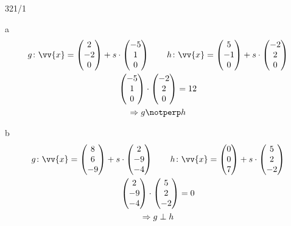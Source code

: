\begin{exercise}{321/1}
  \item [a]
  \begin{gather*}
    g \colon \vv{x} = \begin{pmatrix}2 \\ -2 \\ 0\end{pmatrix} + s \cdot \begin{pmatrix}-5 \\ 1 \\ 0\end{pmatrix} \qquad h \colon \vv{x} = \begin{pmatrix}5 \\ -1 \\ 0\end{pmatrix} + s \cdot \begin{pmatrix}-2 \\ 2 \\ 0\end{pmatrix} \\
    \begin{pmatrix}-5 \\ 1 \\ 0\end{pmatrix} \cdot \begin{pmatrix}-2 \\ 2 \\ 0\end{pmatrix} = 12 \\
    \Rightarrow g \notperp h
  \end{gather*}
  \item [b]
  \begin{gather*}
    g \colon \vv{x} = \begin{pmatrix}8 \\ 6 \\ -9\end{pmatrix} + s \cdot \begin{pmatrix}2 \\ -9 \\ -4\end{pmatrix} \qquad h \colon \vv{x} = \begin{pmatrix}0 \\ 0 \\ 7\end{pmatrix} + s \cdot \begin{pmatrix}5 \\ 2 \\ -2\end{pmatrix} \\
    \begin{pmatrix}2 \\ -9 \\ -4\end{pmatrix} \cdot \begin{pmatrix}5 \\ 2 \\ -2\end{pmatrix} = 0 \\
    \Rightarrow g \perp h
  \end{gather*}
\end{exercise}
